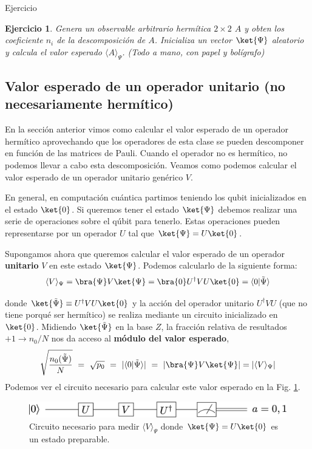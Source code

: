 \documentclass[a4paper,11pt]{book} %
\newtheorem{ejercicio_contador}{Ejercicio}
\newcommand{\Ejercicio}[1]{
		\begin{mybox_gray}{Ejercicio} 
			\begin{ejercicio_contador}
				 #1 
			\end{ejercicio_contador} 
		\end{mybox_gray}
	}
\numberwithin{equation}{chapter}
\newcommand{\braket}[2]{\langle #1|#2\rangle}
\begin{document}
	\Ejercicio{
	Genera un observable arbitrario hermítica $2\times 2$ $A$ y obten los coeficiente $n_i$ de la descomposición de $A$. 
	Inicializa un vector $\ket{\Psi}$ aleatorio y calcula el valor esperado $\langle A \rangle_\Psi$. (Todo a mano, con papel y bolígrafo)
	}
	


        \subsection{Valor esperado de un operador unitario (no necesariamente hermítico)}
        
En la sección anterior vimos como calcular el valor esperado de un operador hermítico aprovechando que los operadores de esta clase se pueden descomponer en función de las matrices de Pauli. Cuando el operador no es hermítico, no podemos llevar a cabo esta descomposición. Veamos como podemos calcular el valor esperado de un operador unitario genérico $V$.

En general, en computación cuántica partimos teniendo los qubit inicializados en el estado $\ket{0}$. Si queremos tener el estado $\ket{\Psi}$ debemos realizar una serie de operaciones sobre el qúbit para tenerlo. Estas operaciones pueden representarse por un operador  $U$ tal que $\ket{\Psi} = U\ket{0}$. 

Supongamos ahora que queremos calcular el valor esperado de un operador \textbf{unitario} $V$ en este estado $\ket{\Psi}$. Podemos calcularlo de la siguiente forma:
$$
\langle V \rangle_\Psi = \bra{\Psi}V\ket{\Psi} = \bra{0} U^\dagger V U\ket{0} = \braket{0}{\tilde \Psi}
$$

donde $\ket{\tilde\Psi} \equiv U^\dagger V U\ket{0}$ y la acción del operador unitario $U^\dagger V U$ (que no tiene porqué ser hermítico) se realiza mediante un circuito inicializado en $\ket{0}$.  Midiendo $\ket{\tilde \Psi}$  en la base $Z$, la fracción relativa de resultados $+1\to  n_0/N$ nos da acceso al \textbf{módulo del valor esperado}, 
$$
\sqrt{ \frac{n_{0}(\tilde\Psi)}{N} } ~=~  \sqrt{p_0}  ~=~   | \braket{0}{\tilde \Psi}|  ~=~ |\bra{\Psi}V\ket{\Psi}|    = |\langle V \rangle_\Psi |
$$
Podemos ver el circuito necesario para calcular este valor esperado en la Fig. \ref{Fig_medidad1_vev_unitary_V}.
	\begin{figure}[H]
	\centering 
	\includegraphics[width=0.6\linewidth]{Figuras/Fig_medidas1_vev_unitary_V.png}
	\caption{Circuito necesario para medir $\langle V\rangle_{\Psi} $ donde $\ket{\Psi} = U\ket{0}$ es un estado preparable.}
	\label{Fig_medidad1_vev_unitary_V}
	\end{figure}
\end{document}
